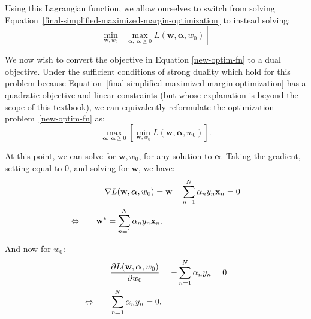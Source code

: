 \fi

Using this Lagrangian function, we allow ourselves to switch from solving Equation~\ref{final-simplified-maximized-margin-optimization} to instead solving:
%
\begin{equation} \label{new-optim-fn}
	\underset{\textbf{w}, w_{0}}{\min}\left[ \max_{\boldsymbol{\alpha} , \ \boldsymbol{\alpha} \geq 0} L(\textbf{w},  \boldsymbol{\alpha},w_0)\right]
\end{equation}


We now wish to convert the objective in Equation \ref{new-optim-fn} to a dual objective. Under the sufficient conditions of strong duality which hold for this problem because Equation~\ref{final-simplified-maximized-margin-optimization} has a quadratic objective and linear constraints (but whose explanation is beyond the scope of this textbook), we can equivalently reformulate the optimization problem~\eqref{new-optim-fn} as:
%
%
\begin{equation} \label{dual-objective}
	\max_{\boldsymbol{\alpha}, \ \boldsymbol{\alpha} \geq 0} \left[\underset{\textbf{w}, w_{0}}{\min} L(\textbf{w},  \boldsymbol{\alpha},w_0)\right].
      \end{equation}
      
      At this point, we can solve for $\textbf{w}, w_{0}$, for any solution to $\boldsymbol{\alpha}$.
      Taking the gradient, setting equal to 0, and solving for $\textbf{w}$, we have:
\begin{align}
  & \quad \nabla L(\textbf{w},  \boldsymbol{\alpha},w_0)= \textbf{w} - \sum_{n=1}^{N} \alpha_{n} y_{n} \textbf{x}_{n} = 0
  \notag  \\
\Leftrightarrow \quad\quad &	\textbf{w}^{*} = \sum_{n=1}^{N} \alpha_{n} y_{n} \textbf{x}_{n}. \label{solve-for-w}
\end{align}

And now for $w_{0}$:
\begin{align}
\quad &	\frac{\partial L(\textbf{w},  \boldsymbol{\alpha},w_0)}{\partial w_{0}} = - \sum_{n=1}^{N} \alpha_{n} y_{n} = 0 \notag\\
\Leftrightarrow
\quad\quad & 	\sum_{n=1}^{N} \alpha_{n} y_{n} = 0. \label{solve-for-w0}
        \end{align}

